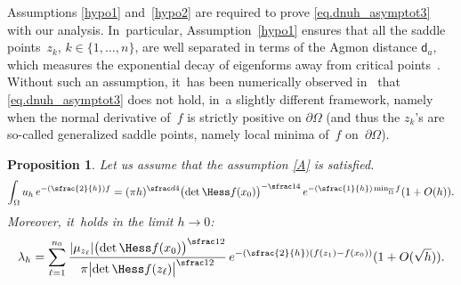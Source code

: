 \documentclass[10pt]{amsart}
\newcommand{\Psfrac}[2]{(\sfrac{#1}{#2})}
\theoremstyle{plain}
\newtheorem{proposition}{Proposition}
\theoremstyle{definition}
\begin{document}
Assumptions \eqref{hypo1} and~\eqref{hypo2} are required to prove
\eqref{eq.dnuh_asymptot3} with our analysis. In~particular, Assumption~\eqref{hypo1}
ensures that all the saddle points~$z_k$, $k\in\{1,\dots,n\}$, are
well separated in terms of the Agmon distance $\mathsf d_a$, which
measures the exponential decay of eigenforms away from critical
points~\cite{HKN}. Without such an assumption, it~has been numerically
observed in~\cite[\S1.6.2]{DLLN} that
\eqref{eq.dnuh_asymptot3} does not hold, in~a slightly different
framework, namely when the normal derivative of~$f$ is strictly
positive on $\partial \Omega$ (and thus the $z_k$'s are so-called
generalized saddle points, namely local minima
of~$f$ on~$\partial \Omega$).

\begin{proposition}\label{pr.LP-N}
Let us assume that the assumption \ref{A} is satisfied.
\begin{equation}\label{eq.moyenn-uh}
\int_\Omega u_h\, e^{-\Psfrac 2h f}= (\pi h)^{\sfrac d4} \bigl(\det \Hess f(x_0)\bigr)^{-\sfrac 14} \, e^{-\Psfrac{1}{h}\min_{\overline{\Omega}} f} (1+O(h)).
\end{equation}
Moreover, it~holds in the limit $h\to 0$:
\begin{equation}\label{eq.lambda_h-Equiv}
\lambda_h= \sum\limits _{ \ell=1 }^{n_0} \frac{ \vert \mu_{z_\ell}\vert \bigl(\det \Hess f (x_0) \bigr)^{\sfrac12} }{ \pi \bigl\vert \det \Hess f (z_\ell) \bigr\vert^{\sfrac12} }\, e^{-\Psfrac 2h (f(z_1)-f(x_0))} (1+O(\sqrt h)).
\end{equation}
\end{proposition}
\end{document}
